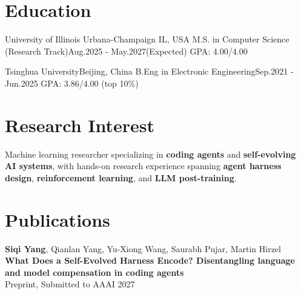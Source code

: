 \section{\textbf{Education}}
\vspace{-0.4mm}
\resumeSubHeadingListStart

\resumeSubheading
{University of Illinois Urbana-Champaign} {IL, USA}
{M.S. in Computer Science (Research Track)}{Aug.2025 - May.2027(Expected)}
\vspace{3mm}
\small{GPA: 4.00/4.00}


\resumeSubheading
{Tsinghua University}{Beijing, China}
{B.Eng in Electronic Engineering}{Sep.2021 - Jun.2025}
\vspace{3mm}
\small{GPA: 3.86/4.00 (top 10\%)}


\resumeSubHeadingListEnd
\vspace{-6mm}


\section{\textbf{Research Interest}}
Machine learning researcher specializing in \textbf{coding agents} and \textbf{self-evolving AI systems}, with hands-on research experience spanning \textbf{agent harness design}, \textbf{reinforcement learning}, and \textbf{LLM post-training}.

\section{\textbf{Publications}}
\vspace{0.5mm}

\textbf{Siqi Yang}, Qianlan Yang, Yu-Xiong Wang, Saurabh Pujar, Martin Hirzel \\
\textbf{What Does a Self-Evolved Harness Encode? Disentangling language and model compensation in coding agents} \\
Preprint, Submitted to AAAI 2027

